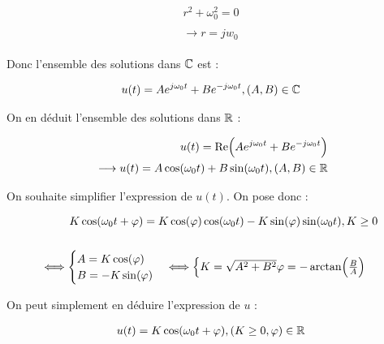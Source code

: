 \documentclass{article}
\begin{document}
\begin{align*}\begin{split}
    r^2+\omega_0^2=0\\\\
    \longrightarrow \boxed{r= jw_0}
\end{split}\end{align*}

Donc l'ensemble des solutions dans $\mathbb{C}$ est :

\begin{align*}\begin{split}
u(t)=Ae^{j\omega_0t}+Be^{-j\omega_0t}, (A, B)\in\mathbb{C}
\end{split}\end{align*}

On en déduit l'ensemble des solutions dans $\mathbb{R}$ :

\begin{align*}\begin{split}
u(t)=\operatorname{\text{Re}}\Bigl(Ae^{j\omega_0t}+Be^{-j\omega_0t}\Bigl)\\\
\longrightarrow u(t)=A\cos(\omega_0t)+B\sin(\omega_0t), (A, B)\in\mathbb{R}
\end{split}\end{align*}

On souhaite simplifier l'expression de $u(t)$. On pose donc :

\begin{align*}\begin{split}
K\cos(\omega_0t+\varphi)=K\cos(\varphi)\cos(\omega_0t)-K\sin(\varphi)\sin(\omega_0t), K\ge0\\\\
\Longleftrightarrow \begin{cases}
    A=K\cos(\varphi)\\
    B=-K\sin(\varphi)
\end{cases}
\Longleftrightarrow \begin{cases}
    K=\sqrt{A^2+B^2}
    \varphi=-\arctan\Bigl(\frac{B}{A}\Bigl)
\end{cases}
\end{split}\end{align*}


On peut simplement en déduire l'expression de $u$ :

\begin{align*}\begin{split}
    u(t)=K\cos(\omega_0t+\varphi), (K\ge0, \varphi)\in\mathbb{R}
\end{split}\end{align*}
\end{document}
